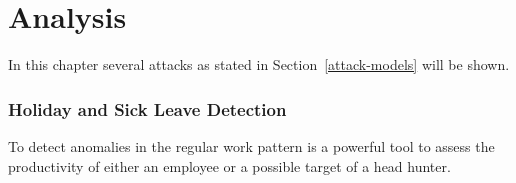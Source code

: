 \chapter{Analysis}\label{analysis}
In this chapter several attacks as stated in Section~\ref{attack-models} will be shown.


\subsection{Holiday and Sick Leave Detection}
To detect anomalies in the regular work pattern is a powerful tool to assess the productivity of either an employee or a possible target of a head hunter.

